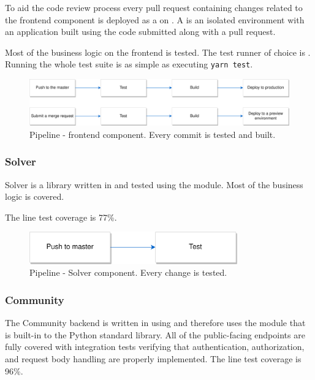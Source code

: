 \medskip

To aid the code review process every pull request containing changes related to the frontend component is deployed as a  on . A  is an isolated environment with an application built using the code submitted along with a pull request.

\medskip

Most of the business logic on the frontend is tested. The test runner of choice is . Running the whole test suite is as simple as executing \texttt{yarn test}.

\begin{figure}[H]
  \caption{Pipeline - frontend component. Every commit is tested and built.}
  \centering
    \includegraphics[width=\textwidth]{assets/3-frontend-pipeline.png}
\end{figure}

\subsubsection{Solver}

Solver is a library written in  and tested using the  module. Most of the business logic is covered. 

The line test coverage is 77\%.

\begin{figure}[H]
  \caption{Pipeline - Solver component. Every change is tested.}
  \centering
    \includegraphics[width=0.8\textwidth]{assets/3-Solver-pipeline.png}
\end{figure}


\subsubsection{Community}

The Community backend is written in  using  and therefore uses the  module that is built-in to the Python standard library. All of the public-facing endpoints are fully covered with integration tests verifying that authentication, authorization, and request body handling are properly implemented. The line test coverage is 96\%.

